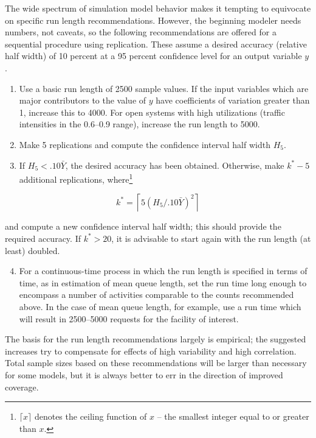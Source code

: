 The wide spectrum of simulation model behavior makes it tempting to
equivocate on specific run length recommendations. However, the beginning
modeler needs numbers, not caveats, so the following recommendations are
offered for a sequential procedure using replication. These assume a desired
accuracy (relative half width) of 10 percent at a 95 percent confidence level
for an output variable $y$.

\begin{enumerate}
\setlength{\itemsep}{0pt}\setlength{\parskip}{0pt}
\item Use a basic run length of 2500 sample values. If the input variables
  which are major contributors to the value of $y$ have coefficients of
  variation greater than 1, increase this to 4000. For open systems with high
  utilizations (traffic intensities in the 0.6--0.9 range), increase the run
  length to 5000.
\item Make 5 replications and compute the confidence interval half width
  $H_5$.
\item If $H_5 < .10\bar{Y}$, the desired accuracy has been obtained. Otherwise, make
  $k^* - 5$ additional replications, where\footnote{$\lceil x \rceil$ denotes the ceiling function of $x$ -- the smallest integer equal to or greater than $x$.}
\end{enumerate}

\begin{equation}
k^* = \left\lceil 5\left(H_5/.10\bar{Y}\right)^2 \right\rceil
\label{eq:output-kstar}
\end{equation}

\noindent and compute a new confidence interval half width; this should provide the
required accuracy. If $k^* > 20$, it is advisable to start again with the run
length (at least) doubled.

\begin{enumerate}
\setcounter{enumi}{3}
\item For a continuous-time process in which the run length is specified in
  terms of time, as in estimation of mean queue length, set the run time long
  enough to encompass a number of activities comparable to the counts
  recommended above. In the case of mean queue length, for example, use a run
  time which will result in 2500--5000 requests for the facility of interest.
\end{enumerate}

The basis for the run length recommendations largely is empirical; the
suggested increases try to compensate for effects of high variability and
high correlation. Total sample sizes based on these recommendations will be
larger than necessary for some models, but it is always better to err in the
direction of improved coverage.

